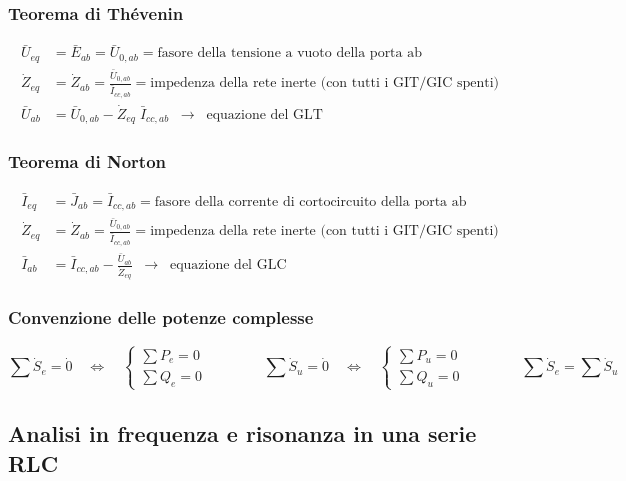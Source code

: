 \documentclass[a4paper]{article}
\begin{document}
\subsubsection*{Teorema di Thévenin}
\begin{align*}
	\bar{U}_{eq} &= \bar{E}_{ab} = \bar{U}_{0,ab} = \text{fasore della tensione a vuoto della porta ab} \\
	\dot{Z}_{eq} &= \dot{Z}_{ab} = \frac{\bar{U}_{0,ab}}{\bar{I}_{cc,ab}} = \text{impedenza della rete inerte (con tutti i GIT/GIC spenti)} \\
	\bar{U}_{ab} &= \bar{U}_{0,ab} - \dot{Z}_{eq} \; \bar{I}_{cc,ab} \;\;\rightarrow\;\; \text{equazione del GLT}
\end{align*}

\subsubsection*{Teorema di Norton}
\begin{align*}
	\bar{I}_{eq} &= \bar{J}_{ab} = \bar{I}_{cc,ab} = \text{fasore della corrente di cortocircuito della porta ab} \\
	\dot{Z}_{eq} &= \dot{Z}_{ab} = \frac{\bar{U}_{0,ab}}{\bar{I}_{cc,ab}} = \text{impedenza della rete inerte (con tutti i GIT/GIC spenti)} \\
	\bar{I}_{ab} &= \bar{I}_{cc,ab} - \frac{\bar{U}_{ab}}{\dot{Z}_{eq}} \;\;\rightarrow\;\; \text{equazione del GLC}
\end{align*}

\subsubsection*{Convenzione delle potenze complesse}
\[\sum \dot{S}_e = \dot{0} \quad \Leftrightarrow \quad \begin{cases}
	\sum P_e = 0 \\
	\sum Q_e = 0
\end{cases} \qquad \qquad \sum \dot{S}_u = \dot{0} \quad \Leftrightarrow \quad \begin{cases}
	\sum P_u = 0 \\
	\sum Q_u = 0
\end{cases} \qquad \qquad \sum \dot{S}_e = \sum \dot{S}_u\]

\newpage

\subsection{Analisi in frequenza e risonanza in una serie RLC}
\end{document}

